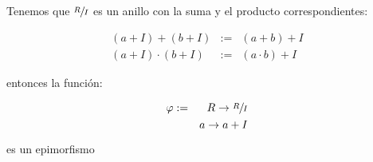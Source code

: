     \begin{observacion}
        Tenemos que $\sfrac{R}{I}$ es un anillo con la suma y el producto correspondientes:

        \begin{eqnarray}
            (a + I) + (b + I) & := & (a + b) + I \\
            (a + I) \cdot (b + I) & := & (a \cdot b) + I
        \end{eqnarray}

        entonces la función:

        \begin{eqnarray*}
            \varphi & := & R \to \sfrac{R}{I} \\
             & & a \to a + I
        \end{eqnarray*}

        es un epimorfismo
    \end{observacion}
